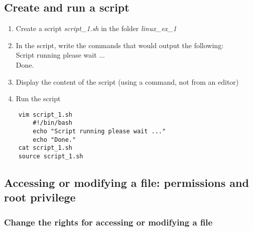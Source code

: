 \subsection{Create and run a script}

\begin{enumerate}
    \item Create a script \textit{script\_1.sh} in the folder \textit{linux\_ex\_1}
    \item In the script, write the commands that would output the following:\\
        Script running please wait ...\\
        Done.
    \item Display the content of the script (using a command, not from an editor)
    \item Run the script
\end{enumerate}

\ifdefined\answer
\begin{verbatim}
    vim script_1.sh
        #!/bin/bash
        echo "Script running please wait ..."
        echo "Done."
    cat script_1.sh
    source script_1.sh
\end{verbatim}
\fi



\subsection{Accessing or modifying a file: permissions and root privilege}

\subsubsection{Change the rights for accessing or modifying a file}

